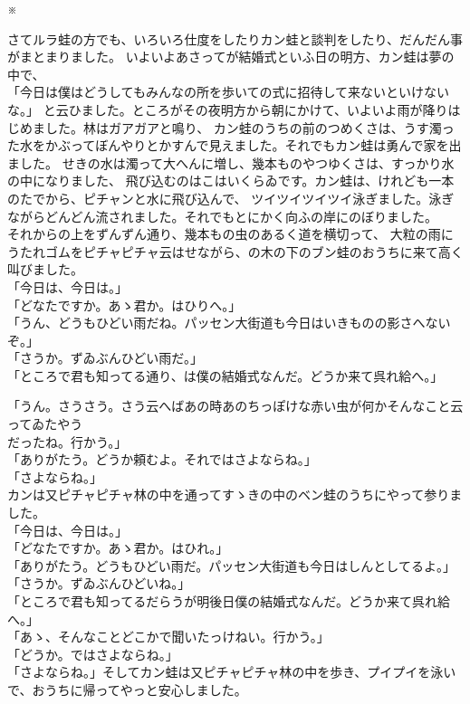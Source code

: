 \documentclass[
a4paper,
10pt,
book]
{tarticle}
\begin{document}
\newpage
\setcounter{page}{14}
\thispagestyle{fancy}
\nolinenumbers
\indent \indent \indent \indent \indent \indent \indent \indent \indent \indent ※

\begin{linenumbers}
\indent さてルラ蛙の方でも、いろいろ仕度をしたりカン蛙と談判をしたり、だんだん事がまとまりました。
いよいよあさってが結婚式といふ日の明方、カン蛙は夢の中で、\\
「今日は僕はどうしてもみんなの所を歩いての式に招待して来ないといけないな。」
と云ひました。ところがその夜明方から朝にかけて、いよいよ雨が降りはじめました。林はガアガアと鳴り、
カン蛙のうちの前のつめくさは、うす濁った水をかぶってぼんやりとかすんで見えました。それでもカン蛙は勇んで家を出ました。
せきの水は濁って大へんに増し、幾本ものやつゆくさは、すっかり水の中になりました、
飛び込むのはこはいくらゐです。カン蛙は、けれども一本のたでから、ピチャンと水に飛び込んで、
ツイツイツイツイ泳ぎました。泳ぎながらどんどん流されました。それでもとにかく向ふの岸にのぼりました。\\
\indent それからの上をずんずん通り、幾本もの虫のあるく道を横切って、
大粒の雨にうたれゴムをピチャピチャ云はせながら、の木の下のブン蛙のおうちに来て高く叫びました。\\
「今日は、今日は。」\\
「どなたですか。あゝ君か。はひりへ。」\\
「うん、どうもひどい雨だね。パッセン大街道も今日はいきものの影さへないぞ。」\\
「さうか。ずゐぶんひどい雨だ。」\\
「ところで君も知ってる通り、は僕の結婚式なんだ。どうか来て呉れ給へ。」
\end{linenumbers}

\newpage
「うん。さうさう。さう云へばあの時あのちっぽけな赤い虫が何かそんなこと云ってゐたやう\\
\indent だったね。行かう。」\\
「ありがたう。どうか頼むよ。それではさよならね。」\\
「さよならね。」\\
\indent カンは又ピチャピチャ林の中を通ってすゝきの中のベン蛙のうちにやって参りました。\\
「今日は、今日は。」\\
「どなたですか。あゝ君か。はひれ。」\\
「ありがたう。どうもひどい雨だ。パッセン大街道も今日はしんとしてるよ。」\\
「さうか。ずゐぶんひどいね。」\\
「ところで君も知ってるだらうが明後日僕の結婚式なんだ。どうか来て呉れ給へ。」\\
「あゝ、そんなことどこかで聞いたっけねい。行かう。」\\
「どうか。ではさよならね。」\\
「さよならね。」そしてカン蛙は又ピチャピチャ林の中を歩き、プイプイを泳いで、おうちに帰ってやっと安心しました。\\
\end{document}
